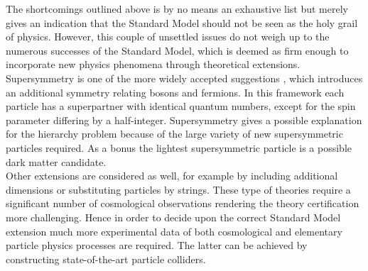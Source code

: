 The shortcomings outlined above is by no means an exhaustive list but merely gives an indication that the Standard Model should not be seen as the holy grail of physics. However, this couple of unsettled issues do not weigh up to the numerous successes of the Standard Model, which is deemed as firm enough to incorporate new physics phenomena through theoretical extensions.
\\
Supersymmetry is one of the more widely accepted suggestions%
, which introduces an additional symmetry relating bosons and fermions.
In this framework each particle has a superpartner with identical quantum numbers, except for the spin parameter differing by a half-integer.
Supersymmetry gives a possible explanation for the hierarchy problem because of the large variety of new supersymmetric particles required. 
As a bonus the lightest supersymmetric particle is a possible dark matter candidate.
\\
Other extensions are considered as well, for example by including additional dimensions or substituting particles by strings. These type of theories require a significant number of cosmological observations rendering the theory certification more challenging. %
Hence in order to decide upon the correct Standard Model extension much more experimental data of both cosmological and elementary particle physics processes are required. The latter can be achieved by constructing state-of-the-art particle colliders.

